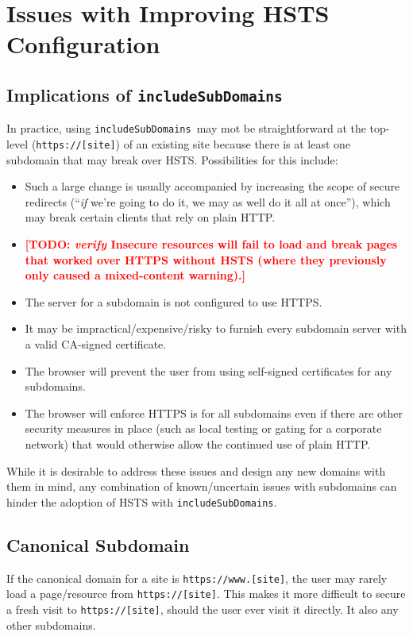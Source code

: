 \documentclass[conference]{./IEEEtran}
\newcommand{\td}[2]{\textcolor{red}{\textbf{[TODO: {\it{#1}} #2]}}}
\newcommand{\site}[1]{\texttt{#1}}
\newcommand{\code}[1]{\texttt{#1}}
\newcommand{\iSD}{{\code{includeSubDomains}}}
\newcommand{\genericsite}{[site]}
\newcommand{\s}{{\site{https://\genericsite}}}
\newcommand{\sw}{{\site{https://www.\genericsite}}}
\theoremstyle{plain}
\begin{document}
\section{Issues with Improving HSTS Configuration}

\subsection{Implications of \iSD}
\label{includeSubDomains-issues}

In practice, using \iSD~may mot be straightforward at the top-level (\s) of an existing site because there is at least one subdomain that may break over HSTS. Possibilities for this include:

\begin{itemize}
\item Such a large change is usually accompanied by increasing the scope of secure redirects (``\emph{if} we're going to do it, we may as well do it all at once''), which may break certain clients that rely on plain HTTP.
\item \td{verify}{Insecure resources will fail to load and break pages that worked over HTTPS without HSTS (where they previously only caused a mixed-content warning).}
\item The server for a subdomain is not configured to use HTTPS.
\item It may be impractical/expensive/risky to furnish every subdomain server with a valid CA-signed certificate.
\item The browser will prevent the user from using self-signed certificates for any subdomains.
\item The browser will enforce HTTPS is for all subdomains even if there are other security measures in place (such as local testing or gating for a corporate network) that would otherwise allow the continued use of plain HTTP.
\end{itemize}

While it is desirable to address these issues and design any new domains with them in mind, any combination of known/uncertain issues with subdomains can hinder the adoption of HSTS with \iSD.

\subsection{Canonical Subdomain}

If the canonical domain for a site is \sw, the user may rarely load a page/resource from \s. This makes it more difficult to secure a fresh visit to \s, should the user ever visit it directly. It also  any other subdomains.
\end{document}
